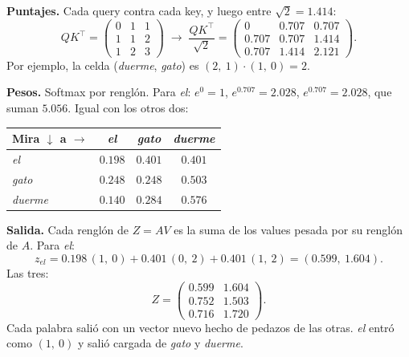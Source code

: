 \documentclass[11pt,letterpaper]{article}
\begin{document}
\begin{ejemplo}
    \textbf{Puntajes.} Cada query contra cada key, y luego entre
    $\sqrt{2} = 1.414$:
    \[
        Q K^{\top} = \begin{pmatrix} 0 & 1 & 1 \\ 1 & 1 & 2 \\
                                     1 & 2 & 3 \end{pmatrix}
        \;\longrightarrow\;
        \frac{Q K^{\top}}{\sqrt{2}}
        = \begin{pmatrix} 0 & 0.707 & 0.707 \\
                          0.707 & 0.707 & 1.414 \\
                          0.707 & 1.414 & 2.121 \end{pmatrix} .
    \]
    Por ejemplo, la celda (\textit{duerme}, \textit{gato}) es
    $(2,\ 1) \cdot (1,\ 0) = 2$.

    \textbf{Pesos.} Softmax por renglón. Para \textit{el}:
    $e^{0} = 1$, $e^{0.707} = 2.028$, $e^{0.707} = 2.028$, que suman
    $5.056$. Igual con los otros dos:
    \begin{center}
    \begin{tabular}{lccc}
        \toprule
        \textbf{Mira} $\downarrow$ \quad \textbf{a} $\rightarrow$
        & \textit{el} & \textit{gato} & \textit{duerme} \\
        \midrule
        \textit{el}     & $0.198$ & $0.401$ & $0.401$ \\
        \textit{gato}   & $0.248$ & $0.248$ & $0.503$ \\
        \textit{duerme} & $0.140$ & $0.284$ & $0.576$ \\
        \bottomrule
    \end{tabular}
    \end{center}

    \textbf{Salida.} Cada renglón de $Z = A V$ es la suma de los
    values pesada por su renglón de $A$. Para \textit{el}:
    \[
        z_{\textit{el}} = 0.198\,(1,\ 0) + 0.401\,(0,\ 2)
                        + 0.401\,(1,\ 2) = (0.599,\ 1.604) .
    \]
    Las tres:
    \[
        Z = \begin{pmatrix} 0.599 & 1.604 \\ 0.752 & 1.503 \\
                            0.716 & 1.720 \end{pmatrix} .
    \]
    Cada palabra salió con un vector nuevo hecho de pedazos de las
    otras. \textit{el} entró como $(1,\ 0)$ y salió cargada de
    \textit{gato} y \textit{duerme}.
\end{ejemplo}
\end{document}
